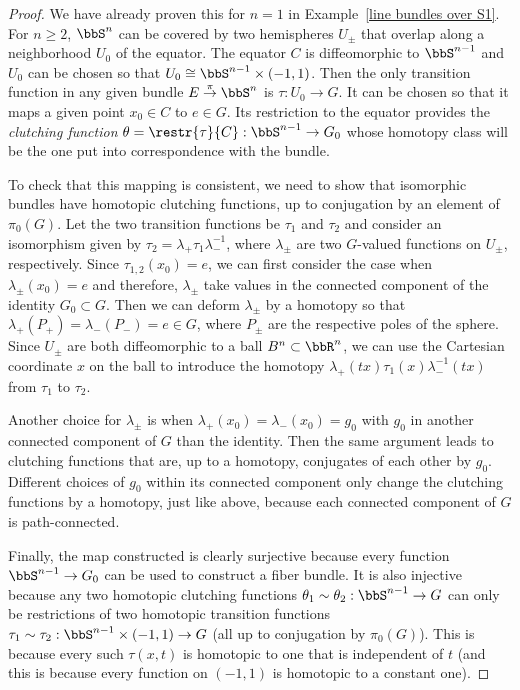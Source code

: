 \begin{proof}
    We have already proven this for $n=1$ in Example~\ref{line bundles over S1}. For $n\geq 2$, $\bbS^n$ can be covered by two hemispheres $U_\pm$ that overlap along a neighborhood $U_0$ of the equator. The equator $C$ is diffeomorphic to $\bbS^{n-1}$ and $U_0$ can be chosen so that $U_0\cong \bbS^{n-1}\times (-1,1)$. Then the only transition function in any given bundle $E\overset{\pi}{\to}\bbS^n$ is $\tau:U_0\to G$. It can be chosen so that it maps a given point $x_0\in C$ to $e\in G$. Its restriction to the equator provides the \emph{clutching function} $\theta=\restr{\tau}{C}:\bbS^{n-1}\to G_0$ whose homotopy class will be the one put into correspondence with the bundle. 
     
    To check that this mapping is consistent, we need to show that isomorphic bundles have homotopic clutching functions, up to conjugation by an element of $\pi_0(G)$. Let the two transition functions be $\tau_1$ and $\tau_2$ and consider an isomorphism given by $\tau_2=\lambda_+ \tau_1 \lambda_-^{-1}$, where $\lambda_\pm$ are two $G$-valued functions on $U_\pm$, respectively. Since $\tau_{1,2}(x_0)=e$, we can first consider the case when $\lambda_\pm(x_0)=e$ and therefore, $\lambda_\pm$ take values in the connected component of the identity $G_0\subset G$. Then we can deform $\lambda_\pm$ by a homotopy so that $\lambda_+(P_+)=\lambda_-(P_-)=e\in G$, where $P_\pm$ are the respective poles of the sphere. Since $U_\pm $ are both diffeomorphic to a ball $B^n\subset\bbR^n$, we can use the Cartesian coordinate $x$ on the ball to introduce the homotopy $\lambda_+(tx)\tau_1(x) \lambda_-^{-1}(tx)$ from $\tau_1$ to $\tau_2$. 
    
    Another choice for $\lambda_\pm$ is when $\lambda_+(x_0)=\lambda_-(x_0)=g_0$ with $g_0$ in another connected component of $G$ than the identity. Then the same argument leads to clutching functions that are, up to a homotopy, conjugates of each other by $g_0$. Different choices of $g_0$ within its connected component only change the clutching functions by a homotopy, just like above, because each connected component of $G$ is path-connected.
    
    Finally, the map constructed is clearly surjective because every function $\bbS^{n-1}\to G_0$ can be used to construct a fiber bundle. It is also injective because any two homotopic clutching functions $\theta_1\sim\theta_2:\bbS^{n-1}\to G$ can only be restrictions of two homotopic transition functions $\tau_1\sim\tau_2:\bbS^{n-1}\times(-1,1)\to G$ (all up to conjugation by $\pi_0(G)$). This is because every such $\tau(x,t)$ is homotopic to one that is independent of $t$ (and this is because every function on $(-1,1)$ is homotopic to a constant one).
\end{proof}


